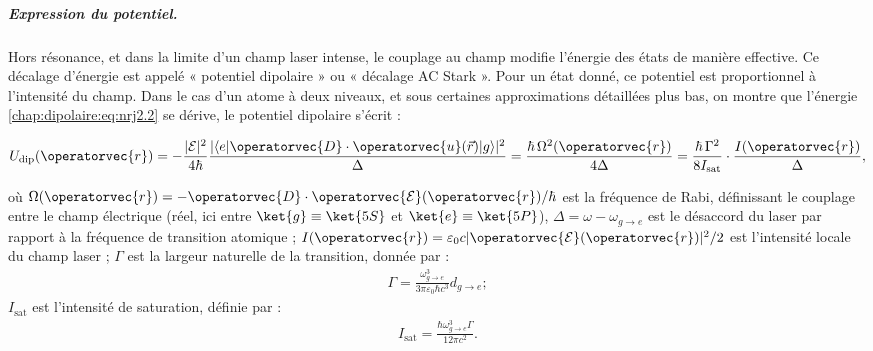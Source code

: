 \subparagraph{Expression du potentiel.}

Hors résonance, et dans la limite d’un champ laser intense, le couplage au champ modifie l’énergie des états de manière effective. Ce décalage d’énergie est appelé « potentiel dipolaire » ou « décalage AC Stark ». Pour un état donné, ce potentiel est proportionnel à l’intensité du champ. Dans le cas d’un atome à deux niveaux, et sous certaines approximations détaillées plus bas, on montre que l'énergie \ref{chap:dipolaire:eq:nrj2.2} se dérive, le potentiel dipolaire s’écrit :


\begin{eqnarray}
	U_{\mathrm{dip}}(\operatorvec{r}) = -\frac{\vert \mathcal{E}\vert^2}{4\hbar}\frac{|\langle e \vert \operatorvec{D} \cdot \operatorvec{u}(\vec{r})\vert g \rangle|^2}{\Delta} = \frac{\hbar \, \Omega^2(\operatorvec{r})}{4 \Delta} 
	= \frac{\hbar \, \Gamma^2}{8 I_{\mathrm{sat}}} \cdot \frac{I(\operatorvec{r})}{\Delta},
	\label{eq:Udip}
\end{eqnarray}

où $\Omega(\operatorvec{r}) = - \operatorvec{D} \cdot \operatorvec{\mathcal{E}}(\operatorvec{r}) / \hbar$ est la fréquence de Rabi, définissant le couplage entre le champ électrique (réel, ici entre $\ket{g} \equiv \ket{5S}$ et $\ket{e} \equiv \ket{5P}$), $\Delta = \omega - \omega_{\scriptstyle g \rightarrow e}$ est le désaccord du laser par rapport à la fréquence de transition atomique ; $I(\operatorvec{r}) = \varepsilon_0 c |\operatorvec{\mathcal{E}}(\operatorvec{r})|^2 / 2$ est l’intensité locale du champ laser ; $\Gamma$ est la largeur naturelle de la transition, donnée par :
	\begin{eqnarray}
		\Gamma = \frac{\omega_{\scriptstyle g \rightarrow e}^3}{3 \pi \varepsilon_0 \hbar c^3} d_{\scriptstyle g \rightarrow e} 
		\label{eq:Gamma};
	\end{eqnarray}
	$I_{\mathrm{sat}}$ est l’intensité de saturation, définie par :
	\begin{eqnarray}
		I_{\mathrm{sat}} = \frac{\hbar \omega_{\scriptstyle g \rightarrow e}^3 \Gamma}{12 \pi c^2}.
	\end{eqnarray}
	

